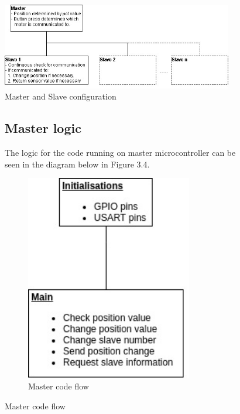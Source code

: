 \begin{figure}[H]
\centering
\includegraphics[width=0.9\textwidth]{Master_slave.jpg}
\caption{Master and Slave configuration}
\label{fig:masterslave}
\end{figure} 



\begin{figure}[H]
  \centering
  \begin{minipage}[b]{0.45\textwidth}
    \subsection{Master logic}
    The logic for the code running on master microcontroller can be seen in the diagram below in Figure 3.4.
    \vspace{2mm}
    \begin{figure}[H]
    \centering
    \includegraphics[width=0.8\textwidth]{Master_flow.jpg}
    \caption{Master code flow}
    \label{fig:MASTERFLOW}
    \end{figure} 
  \end{minipage}
  \hfill
  \begin{minipage}[b]{0.45\textwidth}

\end{minipage}
\end{figure}
